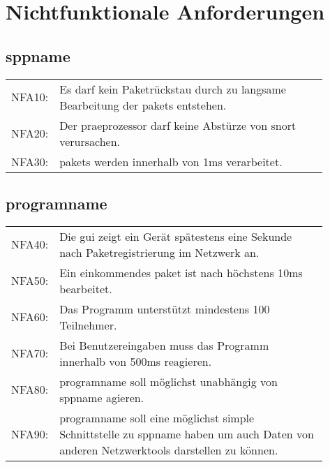 \chapter{Nichtfunktionale Anforderungen}

\section{\gls{sppname}}
\begin{tabular}{lp{0.9\linewidth}}
NFA10: & Es darf kein Paketrückstau durch zu langsame Bearbeitung der \glspl{paket} entstehen. \\

NFA20: & Der \gls{praeprozessor} darf keine Abstürze von \gls{snort} verursachen. \\

NFA30: & \glspl{paket} werden innerhalb von 1ms verarbeitet.
\end{tabular}
\section{\gls{programname}}
\begin{tabular}{lp{0.9\linewidth}}
NFA40: & Die \gls{gui} zeigt ein Gerät spätestens eine Sekunde nach Paketregistrierung im Netzwerk an. \\

NFA50: & Ein einkommendes \gls{paket} ist nach höchstens 10ms bearbeitet. \\

NFA60: & Das Programm unterstützt mindestens 100 Teilnehmer. \\

NFA70: & Bei Benutzereingaben muss das Programm innerhalb von 500ms reagieren. \\

NFA80: & \gls{programname} soll möglichst unabhängig von \gls{sppname} agieren. \\

NFA90: & \gls{programname} soll eine möglichst simple Schnittstelle zu \gls{sppname} haben um auch Daten von anderen Netzwerktools darstellen zu können. \\
\end{tabular}
